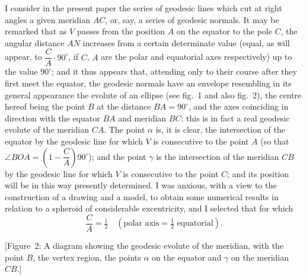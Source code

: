 \documentclass[11pt,a4paper]{article}
\begin{document}
I consider in the present paper the series of geodesic lines which cut at
right angles a given meridian $AC$, or, say, a series of geodesic normals.  It
may be remarked that as $V$ passes from the position $A$ on the equator to the
pole $C$, the angular distance $AN$ increases from a certain determinate value
(equal, as will appear, to $\dfrac{C}{A}\cdot 90^\circ$, if $C$, $A$ are the
polar and equatorial axes respectively) up to the value $90^\circ$; and it
thus appears that, attending only to their course after they first meet the
equator, the geodesic normals have an envelope resembling in its general
appearance the evolute of an ellipse (see fig.~1 and also fig.~2), the centre
hereof being the point $B$ at the distance $BA = 90^\circ$, and the axes
coinciding in direction with the equator $BA$ and meridian $BC$: this is in
fact a real geodesic evolute of the meridian $CA$.  The point $\alpha$ is, it
is clear, the intersection of the equator by the geodesic line for which $V$
is consecutive to the point $A$ (so that $\angle BOA = \left(1 - \dfrac{C}{A}\right)90^\circ$);
and the point $\gamma$ is the intersection of the meridian $CB$ by the geodesic
line for which $V$ is consecutive to the point $C$; and its position will be
in this way presently determined.  I was anxious, with a view to the
construction of a drawing and a model, to obtain some numerical results in
relation to a spheroid of considerable excentricity, and I selected that for
which
\[
\frac{C}{A} = \tfrac{1}{2} \quad (\text{polar axis} = \tfrac{1}{2}\text{ equatorial}).
\]

[Figure~2: A diagram showing the geodesic evolute of the meridian, with the
point $B$, the vertex region, the points $\alpha$ on the equator and $\gamma$
on the meridian $CB$.]

\medskip
\end{document}
